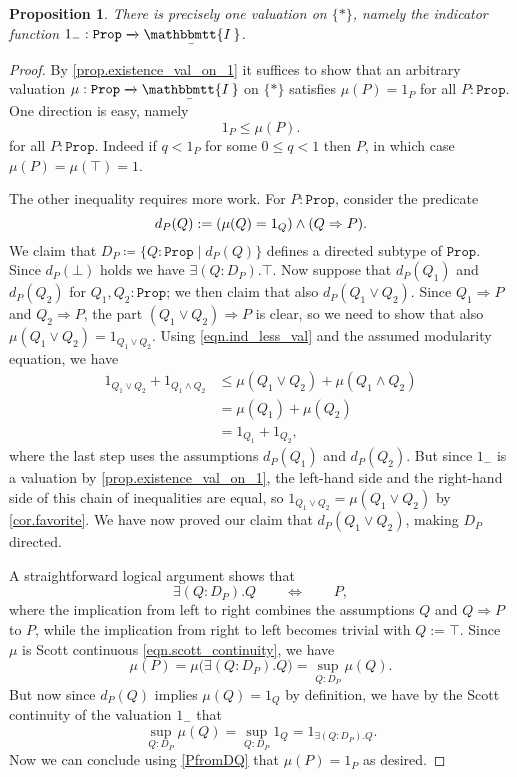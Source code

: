 \documentclass[reqno,11pt]{amsproc}
\theoremstyle{plain}
\newtheorem{proposition}[theorem]{Proposition}
\theoremstyle{definition}
\newcommand{\Const}[1]{\mathtt{#1}}
\renewcommand{\to}[1][]{\xrightarrow{#1}}
\newcommand{\ubar}[1]{\underaccent{\bar}{#1}}
\newcommand{\ind}[1]{1_{#1}}			%
\newcommand{\inc}{\ind{-}}			%
\newcommand{\internal}[1]{\raisebox{-.03ex}{$\mathbbmtt{#1}$}}
\newcommand{\hs}{\hspace{1pt}}
\newcommand{\tii}{\ubar{\internal{I\hs\hs}}\!\hs}
\newcommand{\prop}{\Const{Prop}}
\let\originalleft\left
\let\originalright\right
\renewcommand{\left}{\mathopen{}\mathclose\bgroup\originalleft}
\renewcommand{\right}{\aftergroup\egroup\originalright}
\numberwithin{equation}{section}
\begin{document}
\begin{proposition}\label{prop.uniqueness_val_on_1}
	There is precisely one valuation on $\{*\}$, namely the indicator function $\inc : \prop \to \tii$.
\end{proposition}
\begin{proof}
By \cref{prop.existence_val_on_1} it suffices to show that an arbitrary valuation $\mu : \prop \to \tii$ on $\{*\}$ satisfies $\mu(P) = \ind{P}$ for all $P : \prop$. One direction is easy, namely
	\begin{equation}\label{eqn.ind_less_val}
		\ind{P} \le \mu(P).
	\end{equation}
	for all $P:\prop$. Indeed if $q<\ind{P}$ for some $0 \leq q<1$ then $P$, in which case $\mu(P)=\mu(\top)=1$. 
	
	The other inequality requires more work. For $P:\prop$, consider the predicate
	\[
		d_P(Q) := \left( \mu(Q) = \ind{Q} \right) \land (Q \Rightarrow P).
	\]
	We claim that $D_P\coloneqq\{Q:\prop\mid d_P(Q)\}$ defines a directed subtype of $\prop$. Since $d_P(\bot)$ holds we have $\exists(Q:D_P).\top$. Now suppose that $d_P(Q_1)$ and $d_P(Q_2)$ for $Q_1, Q_2 : \prop$; we then claim that also $d_P(Q_1 \lor Q_2)$. Since $Q_1 \Rightarrow P$ and $Q_2 \Rightarrow P$, the part $(Q_1 \lor Q_2) \Rightarrow P$ is clear, so we need to show that also $\mu(Q_1 \lor Q_2) = \ind{Q_1 \lor Q_2}$. Using \eqref{eqn.ind_less_val} and the assumed modularity equation, we have
	\begin{align*}
		\ind{Q_1 \lor Q_2} + \ind{Q_1 \land Q_2}	& \le \mu(Q_1 \lor Q_2) + \mu(Q_1 \land Q_2)	\\
								& = \mu(Q_1) + \mu(Q_2) \\
								& = \ind{Q_1} + \ind{Q_2},
	\end{align*}
	where the last step uses the assumptions $d_P(Q_1)$ and $d_P(Q_2)$. But since $\inc$ is a valuation by \cref{prop.existence_val_on_1}, the left-hand side and the right-hand side of this chain of inequalities are equal, so $\ind{Q_1 \lor Q_2} = \mu(Q_1 \lor Q_2)$ by \cref{cor.favorite}. We have now proved our claim that $d_P(Q_1 \lor Q_2)$, making $D_P$ directed.

	A straightforward logical argument shows that
	\begin{equation}
		\label{PfromDQ}
		\exists (Q : D_P). Q \qquad \Longleftrightarrow \qquad P,
	\end{equation}
	where the implication from left to right combines the assumptions $Q$ and $Q \Rightarrow P$ to $P$, while the implication from right to left becomes trivial with $Q := \top$. Since $\mu$ is Scott continuous \eqref{eqn.scott_continuity}, we have
	\[
		\mu(P) = \mu\big( \exists (Q : D_P) . Q \big) = \sup_{Q : D_P} \mu(Q).
	\]
	But now since $d_P(Q)$ implies $\mu(Q) = \ind{Q}$ by definition, we have by the Scott continuity of the valuation $\inc$ that
	\[
		\sup_{Q : D_P} \mu(Q) = \sup_{Q : D_P} \ind{Q} = \ind{\exists(Q:D_P).Q}.
	\]
Now we can conclude using \eqref{PfromDQ} that $\mu(P)=\ind{P}$ as desired.
\end{proof}
\end{document}
